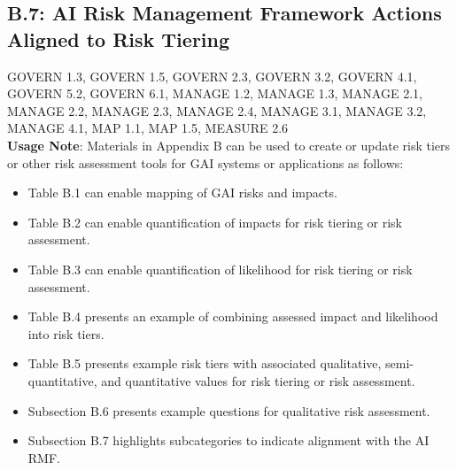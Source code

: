 \documentclass[fleqn]{article}
\begin{document}
\subsection*{B.7: AI Risk Management Framework Actions Aligned to Risk Tiering}\label{appndxb7}

GOVERN 1.3, GOVERN 1.5, GOVERN 2.3, GOVERN 3.2, GOVERN 4.1, GOVERN 5.2, GOVERN 6.1, MANAGE 1.2, MANAGE 1.3, MANAGE 2.1, MANAGE 2.2, MANAGE 2.3, 
MANAGE 2.4, MANAGE 3.1, MANAGE 3.2, MANAGE 4.1, MAP 1.1, MAP 1.5, MEASURE 2.6 \\

\noindent \textbf{Usage Note}: Materials in Appendix B can be used to create or update risk tiers or other risk assessment tools for GAI systems or applications as follows:
\begin{itemize}
	\item Table B.1 can enable mapping of GAI risks and impacts. 
	\item Table B.2 can enable quantification of impacts for risk tiering or risk assessment. 
	\item Table B.3 can enable quantification of likelihood for risk tiering or risk assessment.
	\item Table B.4 presents an example of combining assessed impact and likelihood into risk tiers. 
	\item Table B.5 presents example risk tiers with associated qualitative, semi-quantitative, and quantitative values for risk tiering  or risk assessment.
	\item Subsection B.6 presents example questions for qualitative risk assessment.
	\item Subsection B.7 highlights subcategories to indicate alignment with the AI RMF.   
\end{itemize} 
	
\end{document}
